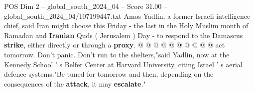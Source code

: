 \begin{textsample}{POS Dim 2 – global\_south\_2024\_04 – Score 31.00 – global\_south\_2024\_04/107199447.txt}
Amos Yadlin, a former Israeli intelligence chief, said Iran might choose this Friday - the last in the Holy Muslim month of Ramadan and \textbf{Iranian} Quds ( Jerusalem ) Day - to respond to the Damascus \textbf{strike}, either directly or through a \textbf{proxy}. @ @ @ @ @ @ @ @ @ @ act tomorrow.
Don't panic.
Don't run to the shelters,"said Yadlin, now at the Kennedy School ' s Belfer Center at Harvard University, citing Israel ' s aerial defence systems."Be tuned for tomorrow and then, depending on the consequences of the \textbf{attack}, it may \textbf{escalate}."

\end{textsample}
